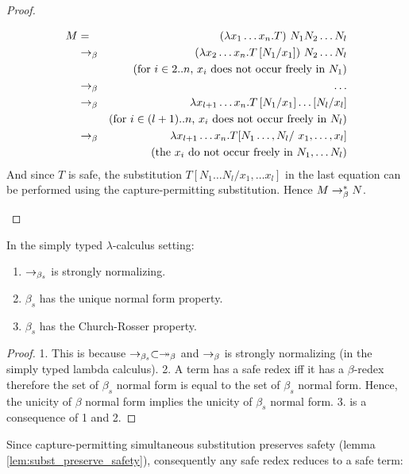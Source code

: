 \begin{proof}
\begin{itemize}
\begin{eqnarray*}
 M &=& (\lambda x_1 \ldots x_n .T) \ N_1  N_2 \ldots N_l  \\
     &\betared& (\lambda x_2 \ldots x_n .T \subst{N_1}{x_1} ) \ N_2 \ldots N_l \\
            && \mbox{(for $i \in 2..n$, $x_i$ does not occur freely in $N_1$)}\\
    &\betared& \ldots \\
    &\betared& \lambda x_{l+1} \ldots x_n . T \subst{N_1}{x_1}  \ldots \subst{N_l}{x_l} \\
        && \mbox{(for $i \in (l+1)..n$,  $x_i$ does not occur freely in $N_l$)}\\
    &\betared& \lambda x_{l+1} \ldots x_n . T [N_1\ldots, N_l /  \ x_1,\ldots, x_l] \\
        && \mbox{(the $x_i$ do not occur freely in $N_1, \ldots N_l$)}
\end{eqnarray*}
And since $T$ is safe, the substitution $T [N_1\ldots N_l/x_1,\ldots x_l]$ in the last equation
can be performed using the capture-permitting substitution. Hence $M \rightarrow_\beta^* N$.
\end{itemize}
\end{proof}

\begin{property} In the simply typed $\lambda$-calculus setting:
\begin{enumerate}
\item $\rightarrow_{\beta_s}$ is strongly normalizing.
\item $\beta_s$ has the unique normal form property.
\item $\beta_s$ has the Church-Rosser property.
\end{enumerate}
\end{property}

\begin{proof}
1. This is because $\rightarrow_{\beta_s} \subset \twoheadrightarrow_\beta$ and $\rightarrow_\beta$ is strongly normalizing (in the simply typed lambda calculus).
2. A term has a safe redex iff it has a $\beta$-redex therefore
the set of $\beta_s$ normal form is equal to the set of $\beta_s$
normal form. Hence, the unicity of $\beta$ normal form implies the
unicity of $\beta_s$ normal form.
3. is a consequence of 1 and 2.
\end{proof}




Since capture-permitting simultaneous substitution preserves safety (lemma \ref{lem:subst_preserve_safety}),
consequently any safe redex reduces to a safe term:

